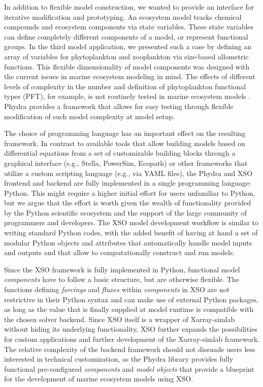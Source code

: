 \documentclass[gmd, manuscript]{copernicus}
\begin{document}
In addition to flexible model construction, we wanted to provide an interface for iterative modification and prototyping. An ecosystem model tracks chemical compounds and ecosystem components via state variables. These state variables can define completely different components of a model, or represent functional groups. In the third model application, we presented such a case by defining an array of variables for phytoplankton and zooplankton via size-based allometric functions. This flexible dimensionality of model components was designed with the current issues in marine ecosystem modeling in mind. The effects of different levels of complexity in the number and definition of phytoplankton functional types (PFT), for example, is not routinely tested in marine ecosystem models \citep{Franks2009}. Phydra provides a framework that allows for easy testing through flexible modification of such model complexity at model setup. 

The choice of programming language has an important effect on the resulting framework. In contrast to available tools that allow building models based on differential equations from a set of customizable building blocks through a graphical interface (e.g., Stella, PowerSim, Ecopath) or other frameworks that utilize a custom scripting language (e.g., via YAML files), the Phydra and XSO frontend and backend are fully implemented in a single programming language: Python. This might require a higher initial effort for users unfamiliar to Python, but we argue that the effort is worth given the wealth of functionality provided by the Python scientific ecosystem and the support of the large community of programmers and developers. The XSO model development workflow is similar to writing standard Python codes, with the added benefit of having at hand a set of modular Python objects and attributes that automatically handle model inputs and outputs and that allow to computationally construct and run models. 

Since the XSO framework is fully implemented in Python, functional model \textit{components} have to follow a basic structure, but are otherwise flexible. The functions defining \textit{forcings} and \textit{fluxes} within \textit{components} in XSO are not restrictive in their Python syntax and can make use of external Python packages, as long as the value that is finally supplied at model runtime is compatible with the chosen solver backend. Since XSO itself is a wrapper of Xarray-simlab without hiding its underlying functionality, XSO further expands the possibilities for custom applications and further development of the Xarray-simlab framework. The relative complexity of the backend framework should not dissuade users less interested in technical customization, as the Phydra library provides fully functional pre-configured \textit{components} and \textit{model objects} that provide a blueprint for the development of marine ecosystem models using XSO. 
\end{document}
